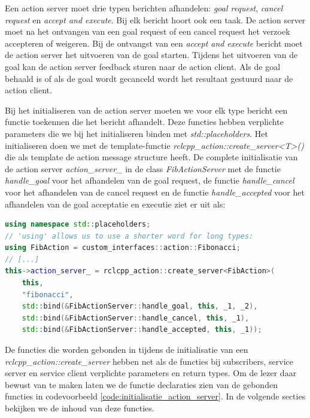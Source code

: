 Een action server moet drie typen berichten afhandelen: \textit{goal request}, \textit{cancel request} en \textit{accept and execute}. Bij elk bericht hoort ook een taak. De action server moet na het ontvangen van een goal request of een cancel request het verzoek accepteren of weigeren. Bij de ontvangst van een \textit{accept and execute} bericht moet de action server het uitvoeren van de goal starten. Tijdens het uitvoeren van de goal kan de action server feedback sturen naar de action client. Als de goal behaald is of als de goal wordt gecanceld wordt het resultaat gestuurd naar de action client.

Bij het initialiseren van de action server moeten we voor elk type bericht een functie toekennen die het bericht afhandelt. Deze functies hebben verplichte parameters die we bij het initialiseren binden met \textit{std::placeholders}. Het initialiseren doen we met de template-functie \textit{rclcpp\_action::create\_server<T>()} die als template de action message structure heeft. De complete initialisatie van de action server \textit{action\_server\_} in de class \textit{FibActionServer} met de functie \textit{handle\_goal} voor het afhandelen van de goal request, de functie \textit{handle\_cancel} voor het afhandelen van de cancel request en de functie \textit{handle\_accepted} voor het afhandelen van de goal acceptatie en executie ziet er uit als:

\begin{lstlisting}[language=C++, caption={Initialisatie van de action server \textit{action\_sever\_}.}, firstnumber=0, label={code:initialisatie_action_server}]
using namespace std::placeholders;
// 'using' allows us to use a shorter word for long types:
using FibAction = custom_interfaces::action::Fibonacci;
// [...]
this->action_server_ = rclcpp_action::create_server<FibAction>(
    this,
    "fibonacci",
    std::bind(&FibActionServer::handle_goal, this, _1, _2),
    std::bind(&FibActionServer::handle_cancel, this, _1),
    std::bind(&FibActionServer::handle_accepted, this, _1));
\end{lstlisting}

De functies die worden gebonden in tijdens de initialisatie van een \textit{rclcpp\_action::create\_server} hebben net als de functies bij subscribers, service server en service client verplichte parameters en return types. Om de lezer daar bewust van te maken laten we de functie declaraties zien van de gebonden functies in codevoorbeeld \ref{code:initialisatie_action_server}. In de volgende secties bekijken we de inhoud van deze functies.

